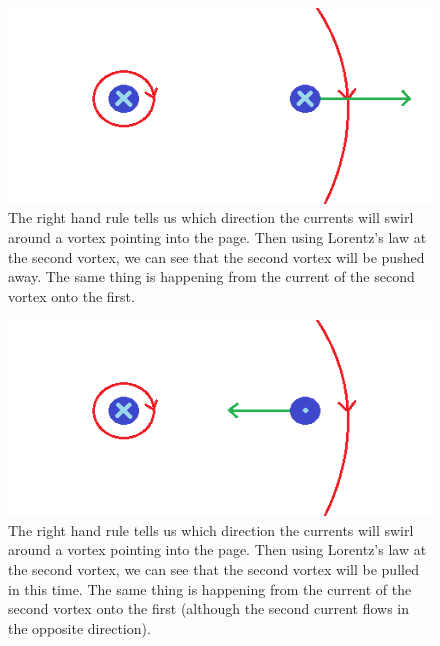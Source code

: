 \begin{figure}[htbp]
\begin{center}
\includegraphics[scale=.50]{sameVortex.png}
\caption{The right hand rule tells us which direction the currents will swirl around a vortex pointing into the page. Then using Lorentz's law  at the second vortex, we can see that the second vortex will be pushed away. The same thing is happening from the current of the second vortex onto the first.}
\label{sameV}
\end{center}
\end{figure}

\begin{figure}[htbp]
\begin{center}
\includegraphics[scale=.50]{oppositeVortex.png}
\caption{The right hand rule tells us which direction the currents will swirl around a vortex pointing into the page. Then using Lorentz's law  at the second vortex, we can see that the second vortex will be pulled in this time. The same thing is happening from the current of the second vortex onto the first (although the second current flows in the opposite direction).}
\label{diffV}
\end{center}
\end{figure}

